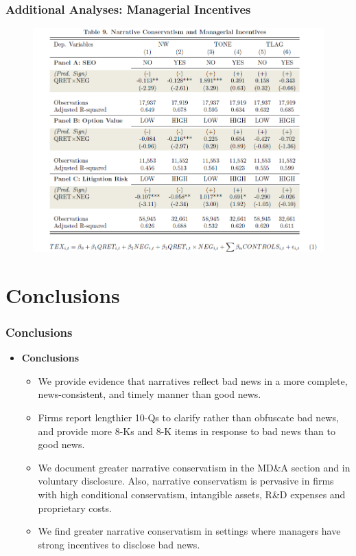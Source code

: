 \documentclass{beamer}
\begin{document}
\begin{frame}
	\frametitle{Additional Analyses: Managerial Incentives}
	\begin{figure}[h]
	\centering
	\includegraphics[width=0.8\linewidth]{tab9}
	\label{tab9}
	\end{figure}
\end{frame}
\section{Conclusions}
\begin{frame}
\frametitle{Conclusions}
\begin{itemize}
	\item \textbf{Conclusions}
	\begin{itemize}
		\item We provide evidence that narratives reflect bad news in a more complete, news-consistent, and timely manner than good news. 
		\item Firms report lengthier 10-Qs to clarify rather than obfuscate bad news, and provide more 8-Ks and 8-K items in response to bad news than to good news.
		\item We document greater narrative conservatism in the MD\&A section and in voluntary disclosure. Also, narrative conservatism is pervasive in firms with high conditional conservatism, intangible assets, R\&D expenses and proprietary costs.
		\item We find greater narrative conservatism in settings where managers have strong incentives to disclose bad news.
	\end{itemize}


	
\end{itemize}

\end{frame}
\end{document}
